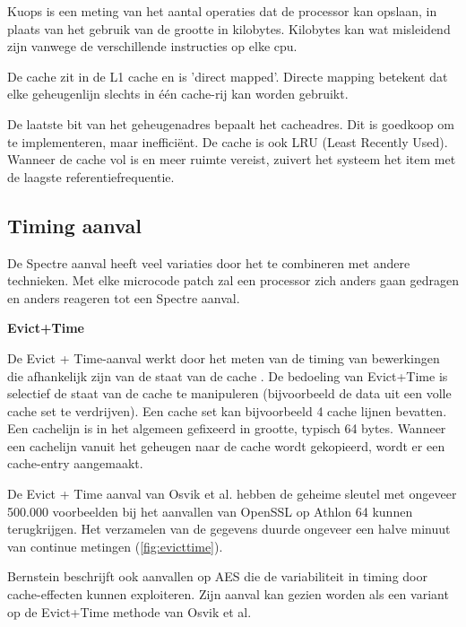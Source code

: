 Kuops is een meting van het aantal operaties dat de processor kan opslaan, in plaats van het gebruik van de grootte in kilobytes.
Kilobytes kan wat misleidend zijn vanwege de verschillende instructies op elke cpu.

De cache zit in de L1 cache en is 'direct mapped'.
Directe mapping betekent dat elke geheugenlijn slechts in één cache-rij kan worden gebruikt.

De laatste bit van het geheugenadres bepaalt het cacheadres.
Dit is goedkoop om te implementeren, maar inefficiënt.
De cache is ook LRU (Least Recently Used).
Wanneer de cache vol is en meer ruimte vereist, zuivert het systeem het item met de laagste referentiefrequentie. \parencite{Lee2001}











\subsection{Timing aanval}
De Spectre aanval heeft veel variaties door het te combineren met andere technieken.
Met elke microcode patch zal een processor zich anders gaan gedragen en anders reageren tot een Spectre aanval.

\textbf{Evict+Time}

De Evict + Time-aanval werkt door het meten van de timing van bewerkingen die afhankelijk zijn van de
staat van de cache \parencite{Osvik2006}.
De bedoeling van Evict+Time is selectief de staat van de cache te manipuleren (bijvoorbeeld de data uit een volle cache set te verdrijven).
Een cache set kan bijvoorbeeld 4 cache lijnen bevatten.
Een cachelijn is in het algemeen gefixeerd in grootte, typisch 64 bytes.
Wanneer een cachelijn vanuit het geheugen naar de cache wordt gekopieerd, wordt er een cache-entry aangemaakt.

De Evict + Time aanval van Osvik et al. \parencite{Osvik2006} hebben de geheime sleutel met ongeveer 500.000
voorbeelden bij het aanvallen van OpenSSL op Athlon 64 kunnen terugkrijgen. Het verzamelen van de gegevens duurde ongeveer een halve minuut van continue metingen (\ref{fig:evicttime}).

Bernstein \parencite{Bernstein2005} beschrijft ook aanvallen op AES
die de variabiliteit in timing door cache-effecten kunnen exploiteren.
Zijn aanval kan gezien worden als een variant op de Evict+Time methode van Osvik et al.

